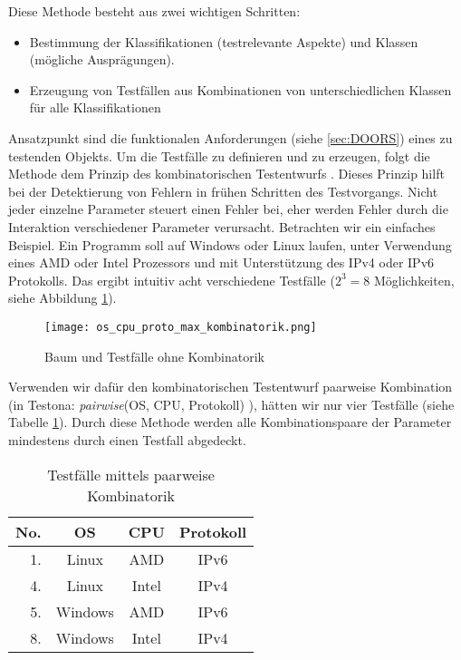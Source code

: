  Diese Methode besteht aus zwei wichtigen Schritten:
\begin{itemize}
\item Bestimmung der Klassifikationen (testrelevante Aspekte) und Klassen (mögliche Ausprägungen).
\item Erzeugung von Testfällen aus Kombinationen von unterschiedlichen Klassen für alle Klassifikationen
\end{itemize}

Ansatzpunkt sind die funktionalen Anforderungen (siehe \ref{sec:DOORS}) eines zu testenden Objekts. Um die Testfälle zu definieren und zu erzeugen, folgt die Methode dem Prinzip des kombinatorischen Testentwurfs \cite{KlassifikationsbaumMethode}. Dieses Prinzip hilft bei der Detektierung von Fehlern in frühen Schritten des Testvorgangs. Nicht jeder einzelne Parameter steuert einen Fehler bei, eher werden Fehler durch die Interaktion verschiedener Parameter verursacht. Betrachten wir ein einfaches Beispiel. Ein Programm soll auf Windows oder Linux laufen, unter Verwendung eines AMD oder Intel Prozessors und mit Unterstützung des IPv4 oder IPv6 Protokolls. Das ergibt intuitiv acht verschiedene Testfälle ($2^{3} = 8$ Möglichkeiten, siehe Abbildung \ref{ttn.no_kombi}).\\

\begin{figure}[h]
  \begin{center}
    \texttt{[image: os\_cpu\_proto\_max\_kombinatorik.png]}
  		  \caption{Baum und Testfälle ohne Kombinatorik}
     \label{ttn.no_kombi}
  \end{center}
\end{figure}


Verwenden wir dafür den kombinatorischen Testentwurf \glqq paarweise Kombination\grqq~ (in Testona: \textit{pairwise}(OS, CPU, Protokoll) ), hätten wir nur vier Testfälle (siehe Tabelle \ref{table:4TestCases}). Durch diese Methode werden alle Kombinationspaare der Parameter mindestens durch einen Testfall abgedeckt\cite{CombinatorialSoftTesting}.\\

\begin{table}[h]


\begin{center}
	\begin{tabular}{|r||c|c|c|}
	 \hline
	 No. &OS &CPU &Protokoll\\
	 \hline
	 1. &Linux &AMD &IPv6\\
	 \hline
	 4. &Linux &Intel &IPv4\\
	 \hline
	 5. &Windows &AMD &IPv6\\
	 \hline
	 8. &Windows &Intel &IPv4\\
	 \hline
	\end{tabular}
	
	\caption{Testfälle mittels paarweise Kombinatorik}
	\label{table:4TestCases}
\end{center}

\end{table}


